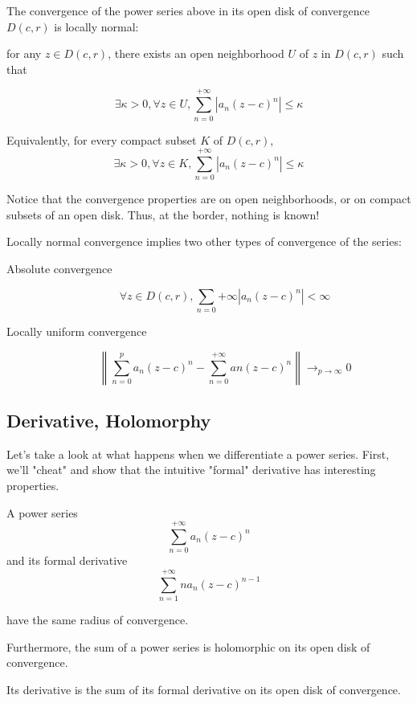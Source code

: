\begin{thm*}
    The convergence of the power series above in its open disk of convergence $D(c, r)$ is locally normal:
    
    for any $z\in D(c,r)$, there exists an open neighborhood $U$ of $z$ in $D(c, r)$ such that

    $$\exists \kappa > 0, \forall z \in U, \sum_{n=0}^{+\infty}|a_n(z-c)^n| \leq \kappa$$


    Equivalently, for every compact subset $K$ of $D(c,r)$,
    $$\exists \kappa > 0, \forall z \in K, \sum_{n=0}^{+\infty}|a_n(z-c)^n| \leq \kappa$$

\end{thm*}

\begin{note}
    Notice that the convergence properties are on open neighborhoods, or on compact subsets of an open disk. Thus, at the border, nothing is known!
\end{note}
    
\begin{thm*}
    Locally normal convergence implies two other types of convergence of the series:

    \begin{description}
        \item[Absolute convergence] 
        $$\forall z \in D(c,r), \sum_{n=0}{+\infty}|a_n(z-c)^n| < \infty$$
        \item[Locally uniform convergence] 
            $$\left\|\sum_{n=0}^{p}a_n(z-c)^n - \sum_{n=0}^{+\infty}an(z-c)^n\right\|\rightarrow_{p\rightarrow\infty} 0$$
    \end{description}
\end{thm*}

\subsection{Derivative, Holomorphy}

Let's take a look at what happens when we differentiate a power series. First, we'll "cheat" and show that the intuitive "formal" derivative has interesting properties.
\begin{thm*}
    A power series 
$$\sum_{n=0}^{+\infty}a_n(z-c)^n$$
and its formal derivative 
$$\sum_{n=1}^{+\infty}na_n(z-c)^{n-1}$$

have the same radius of convergence.

Furthermore, the sum of a power series is holomorphic on its open disk of convergence.

Its derivative is the sum of its formal derivative on its open disk of convergence.

\end{thm*}

